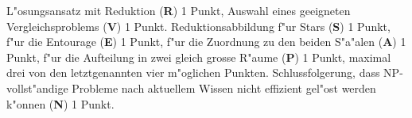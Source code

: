 \begin{bewertung}
L"osungsansatz mit Reduktion ({\bf R}) 1 Punkt,
Auswahl eines geeigneten Vergleichsproblems ({\bf V}) 1 Punkt.
Reduktionsabbildung f"ur Stars ({\bf S}) 1 Punkt,
f"ur die Entourage ({\bf E}) 1 Punkt,
f"ur die Zuordnung zu den beiden S"a"alen ({\bf A}) 1 Punkt,
f"ur die Aufteilung in zwei gleich grosse R"aume ({\bf P}) 1 Punkt,
maximal drei von den letztgenannten vier m"oglichen Punkten.
Schlussfolgerung, dass NP-vollst"andige Probleme nach aktuellem
Wissen nicht effizient gel"ost werden k"onnen ({\bf N}) 1 Punkt.
\end{bewertung}
